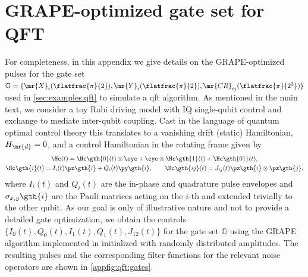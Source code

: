 \section{GRAPE-optimized gate set for QFT}\label{appsec:qft}
For completeness, in this appendix we give details on the GRAPE-optimized pulses for the gate set $\mathbb{G} = \lbrace\mr{X}_{i}(\flatfrac{\pi}{2}),\mr{Y}_{i}(\flatfrac{\pi}{2}),\mr{CR}_{ij}(\flatfrac{\pi}{2^3})\rbrace$ used in \cref{sec:examples:qft} to simulate a \gls{qft} algorithm. As mentioned in the main text, we consider a toy Rabi driving model with IQ single-qubit control and exchange to mediate inter-qubit coupling. Cast in the language of quantum optimal control theory this translates to a vanishing drift (static) Hamiltonian, $H_\mr{d} =  0$, and a control Hamiltonian in the rotating frame given by
\begin{gather}
    \Hc(t) = \Hc\gth{0}(t)\otimes\eye + \eye\otimes\Hc\gth{1}(t) + \Hc\gth{01}(t), \\
    \Hc\gth{i}(t) = I_i(t)\px\gth{i} + Q_i(t)\py\gth{i},\qquad\Hc\gth{ij}(t) = J_{ij}(t)\pz\gth{i}\otimes\pz\gth{j},
\end{gather}
where $I_i(t)$ and $Q_i(t)$ are the in-phase and quadrature pulse envelopes and $\sigma_{x,y}\gth{i}$ are the Pauli matrices acting on the $i$-th and extended trivially to the other qubit. As our goal is only of illustrative nature and not to provide a detailed gate optimization, we obtain the controls $\lbrace I_0(t), Q_0(t), I_1(t), Q_1(t), J_{12}(t)\rbrace$ for the gate set $\mathbb{G}$ using the GRAPE algorithm implemented in \qutip \cite{Johansson2013} initialized with randomly distributed amplitudes. The resulting pulses and the corresponding filter functions for the relevant noise operators are shown in \cref{appfig:qft:gates}.

